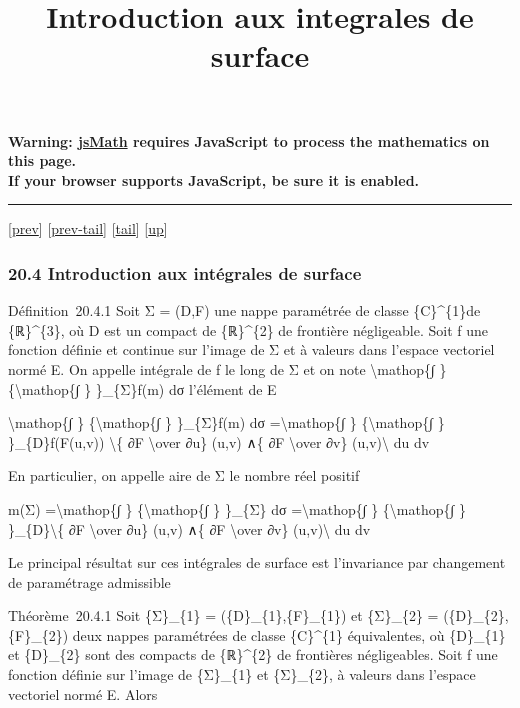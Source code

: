 \documentclass[]{article}
\title{Introduction aux integrales de surface}
\author{}
\date{}
\begin{document}
\maketitle

\textbf{Warning: \href{http://www.math.union.edu/locate/jsMath}{jsMath}
requires JavaScript to process the mathematics on this page.\\ If your
browser supports JavaScript, be sure it is enabled.}

\begin{center}\rule{3in}{0.4pt}\end{center}

{[}\href{coursse106.html}{prev}{]}
{[}\href{coursse106.html\#tailcoursse106.html}{prev-tail}{]}
{[}\hyperref[tailcoursse107.html]{tail}{]}
{[}\href{coursch21.html\#coursse107.html}{up}{]}

\subsubsection{20.4 Introduction aux intégrales de surface}

Définition~20.4.1 Soit Σ = (D,F) une nappe paramétrée de classe
\{C\}\^{}\{1\}de \{ℝ\}\^{}\{3\}, où D est un compact de \{ℝ\}\^{}\{2\}
de frontière négligeable. Soit f une fonction définie et continue sur
l'image de Σ et à valeurs dans l'espace vectoriel normé E. On appelle
intégrale de f le long de Σ et on note \textbackslash{}mathop\{∫ \}
\{\textbackslash{}mathop\{∫ \} \}\_\{Σ\}f(m) dσ l'élément de E

\textbackslash{}mathop\{∫ \} \{\textbackslash{}mathop\{∫ \}
\}\_\{Σ\}f(m) dσ =\textbackslash{}mathop\{∫ \}
\{\textbackslash{}mathop\{∫ \} \}\_\{D\}f(F(u,v))
\textbackslash{}\textbar{}\{ ∂F \textbackslash{}over ∂u\} (u,v) ∧\{ ∂F
\textbackslash{}over ∂v\} (u,v)\textbackslash{}\textbar{} du dv

En particulier, on appelle aire de Σ le nombre réel positif

m(Σ) =\textbackslash{}mathop\{∫ \} \{\textbackslash{}mathop\{∫ \}
\}\_\{Σ\} dσ =\textbackslash{}mathop\{∫ \} \{\textbackslash{}mathop\{∫
\} \}\_\{D\}\textbackslash{}\textbar{}\{ ∂F \textbackslash{}over ∂u\}
(u,v) ∧\{ ∂F \textbackslash{}over ∂v\} (u,v)\textbackslash{}\textbar{}
du dv

Le principal résultat sur ces intégrales de surface est l'invariance par
changement de paramétrage admissible

Théorème~20.4.1 Soit \{Σ\}\_\{1\} = (\{D\}\_\{1\},\{F\}\_\{1\}) et
\{Σ\}\_\{2\} = (\{D\}\_\{2\},\{F\}\_\{2\}) deux nappes paramétrées de
classe \{C\}\^{}\{1\} équivalentes, où \{D\}\_\{1\} et \{D\}\_\{2\} sont
des compacts de \{ℝ\}\^{}\{2\} de frontières négligeables. Soit f une
fonction définie sur l'image de \{Σ\}\_\{1\} et \{Σ\}\_\{2\}, à valeurs
dans l'espace vectoriel normé E. Alors
\end{document}
